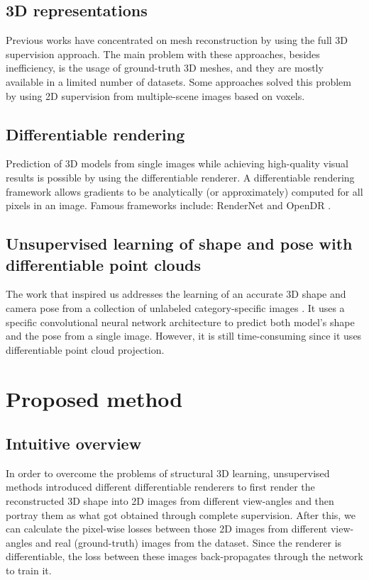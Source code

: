 \documentclass[runningheads]{llncs}
\begin{document}
\subsection{3D representations}
Previous works \cite{tatarchenko2017octree,wu2017marrnet} have concentrated on mesh reconstruction by using the full 3D supervision approach. The main problem with these approaches, besides inefficiency, is the usage of ground-truth 3D meshes, and they are mostly available in a limited number of datasets. Some approaches \cite{tulsiani2018multiview,tulsiani2017multiview} solved this problem by using 2D supervision from multiple-scene images based on voxels.

\subsection{Differentiable rendering}
Prediction of 3D models from single images while achieving high-quality visual results is possible by using the differentiable renderer. A differentiable rendering framework allows gradients to be analytically (or approximately) computed for all pixels in an image. Famous frameworks include: RenderNet \cite{nguyenphuoc2019rendernet} and OpenDR \cite{loper2014opendr}.

\subsection{Unsupervised learning of shape and pose with differentiable point clouds}
The work that inspired us addresses the learning of an accurate 3D shape and camera pose from a collection of unlabeled category-specific images \cite{DBLP:journals/corr/abs-1810-09381}. It uses a specific convolutional neural network architecture to predict both model's shape and the pose from a single image. However, it is still time-consuming since it uses differentiable point cloud projection.

\section{Proposed method}

\subsection{Intuitive overview}
In order to overcome the problems of structural 3D learning, unsupervised methods introduced different differentiable renderers \cite{DBLP:journals/corr/abs-1810-09381,NIPS2016_1d94108e,kato2020differentiable,NEURIPS2019_f5ac21cd,liu2019soft,loper2014opendr,nguyenphuoc2019rendernet} to first render the reconstructed 3D shape into 2D images from different view-angles and then portray them as what got obtained through complete supervision. After this, we can calculate the pixel-wise losses between those 2D images from different view-angles and real (ground-truth) images from the dataset. Since the renderer is differentiable, the loss between these images back-propagates through the network to train it.
\end{document}
